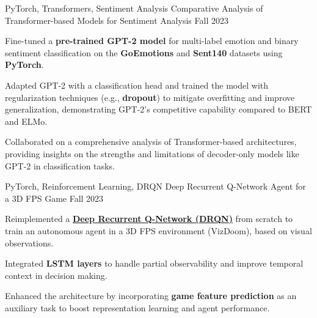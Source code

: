 \begin{cventries}
\cventry
    {PyTorch, Transformers, Sentiment Analysis} %
    {Comparative Analysis of Transformer-based Models for Sentiment Analysis} %
    {} %
    {Fall 2023} %
    {
      \begin{cvitems}
        \item {Fine-tuned a \textbf{pre-trained GPT-2 model} for multi-label emotion and binary sentiment classification on the \textbf{GoEmotions} and \textbf{Sent140} datasets using \textbf{PyTorch}.}
        \item {Adapted GPT-2 with a classification head and trained the model with regularization techniques (e.g., \textbf{dropout}) to mitigate overfitting and improve generalization, demonstrating GPT-2's competitive capability compared to BERT and ELMo.}
        \item {Collaborated on a comprehensive analysis of Transformer-based architectures, providing insights on the strengths and limitations of decoder-only models like GPT-2 in classification tasks.}
      \end{cvitems}
    }

\cventry
    {PyTorch, Reinforcement Learning, DRQN} %
    {Deep Recurrent Q-Network Agent for a 3D FPS Game} %
    {} %
    {Fall 2023} %
    {
      \begin{cvitems}
        \item {Reimplemented a \textbf{\href{https://arxiv.org/pdf/1609.05521}{Deep Recurrent Q-Network (DRQN)}} from scratch to train an autonomous agent in a 3D FPS environment (VizDoom), based on visual observations.}
        \item {Integrated \textbf{LSTM layers} to handle partial observability and improve temporal context in decision making.}
        \item {Enhanced the architecture by incorporating \textbf{game feature prediction} as an auxiliary task to boost representation learning and agent performance.}
      \end{cvitems}
    }


\end{cventries}
